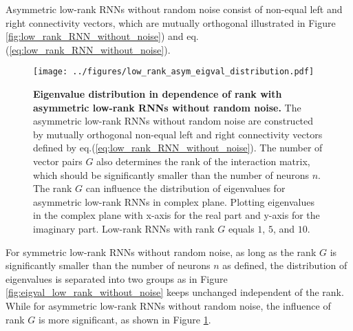 \documentclass[11pt]{article}
\begin{document}
	Asymmetric low-rank RNNs without random noise consist of non-equal left and right connectivity vectors, which are mutually orthogonal illustrated in Figure \ref{fig:low_rank_RNN_without_noise}) and eq.(\ref{eq:low_rank_RNN_without_noise}). 
		\begin{figure}[H]
			\centering 
			\texttt{[image: ../figures/low\_rank\_asym\_eigval\_distribution.pdf]}
			\caption[Eigenvalue distribution in dependence of rank with asymmetric low-rank RNNs without random noise]{\textbf{Eigenvalue distribution in dependence of rank with asymmetric low-rank RNNs without random noise.} The asymmetric low-rank RNNs without random noise are constructed by mutually orthogonal non-equal left and right connectivity vectors defined by eq.(\ref{eq:low_rank_RNN_without_noise}). The number of vector pairs $G$ also determines the rank of the interaction matrix, which should be significantly smaller than the number of neurons $n$. The rank $G$ can influence the distribution of eigenvalues for asymmetric low-rank RNNs in complex plane. Plotting eigenvalues in the complex plane with x-axis for the real part and y-axis for the imaginary part. Low-rank RNNs with rank $G$ equals $1$, $5$, and $10$.}
			\label{fig:eigval_distribution_asym_low_rank_without_noise}
		\end{figure}
	
	\vspace{0.5cm}
	For symmetric low-rank RNNs without random noise, as long as the rank $G$ is significantly smaller than the number of neurons $n$ as defined, the distribution of eigenvalues is separated into two groups as in Figure \ref{fig:eigval_low_rank_without_noise} keeps unchanged independent of the rank. While for asymmetric low-rank RNNs without random noise, the influence of rank $G$ is more significant, as shown in Figure \ref{fig:eigval_distribution_asym_low_rank_without_noise}. 
	
\end{document}
